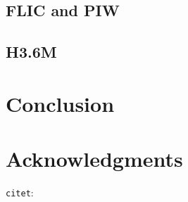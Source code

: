 \documentclass{article}
\begin{document}
\subsection{FLIC and PIW}




\subsection{H3.6M}



\section{Conclusion}

\section*{Acknowledgments}

\verb|citet|: \citet{tompson2014joint}



\end{document}
